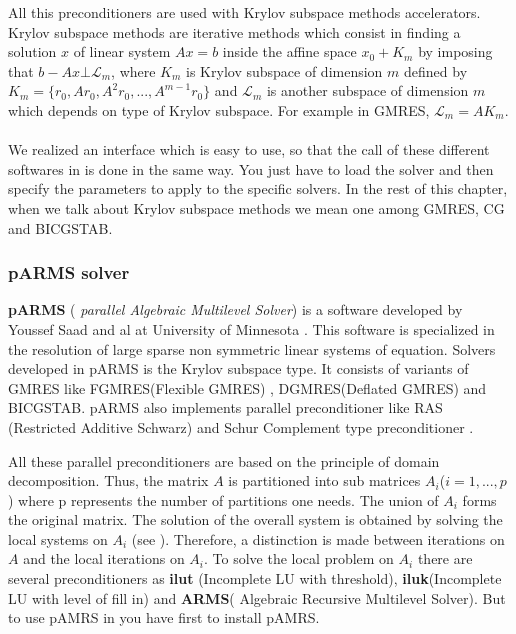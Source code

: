 \documentclass[a4paper,twoside,12pt]{book}
\begin{document}
All this preconditioners are used with Krylov subspace methods accelerators.
Krylov subspace methods are iterative methods
which consist in finding a solution $x$ of linear system $Ax=b$ inside the
affine space $x_0+K_m$ by imposing that $b-Ax \bot \mathcal{L}_m$, where $K_m$
is Krylov subspace of dimension $m$ defined by $K_m=\{r_0, Ar_0,
A^2r_0,...,A^{m-1}r_0\}$ and $\mathcal{L}_m$ is another subspace of dimension
$m$ which depends on type of Krylov subspace. For example in GMRES,
$\mathcal{L}_m=AK_m$.
\\\\
We realized an interface which is easy to use, so that the call of these
different softwares in \freefempp is done in the same way.
You just have to load the solver and then specify the parameters to  apply to
the specific  solvers. In the rest of this chapter,
when  we talk about Krylov subspace methods we mean one among  GMRES, CG and
BICGSTAB.

\subsubsection{pARMS solver}
\label{sectionparms}
\textbf{pARMS} ( \textit{parallel Algebraic Multilevel Solver})
is a software developed by Youssef Saad and al at University of
 Minnesota \cite{spARMS}.
This software is specialized in the resolution of large sparse non symmetric
linear systems of equation. Solvers developed in pARMS is the Krylov subspace
type.
It consists of variants of GMRES like FGMRES(Flexible GMRES)  , DGMRES(Deflated
GMRES) \cite{SAAD03} and  BICGSTAB.
pARMS also implements parallel preconditioner like RAS (Restricted Additive
Schwarz)\cite{CAI89}
and Schur Complement type preconditioner \cite{LISAAD}.



All these  parallel preconditioners are based on the principle of domain
decomposition.
Thus, the matrix $A$ is partitioned into sub matrices $A_i$($i=1,...,p$) where
p represents the number of partitions one needs.
The union of $A_i$ forms the original matrix.
The solution of the overall system is obtained by solving the local systems on
$A_i$ (see \cite{Smith96}).
Therefore, a distinction is made between iterations on $A$ and the local
iterations on $A_i$.
To solve the local problem on $A_i$ there are several preconditioners as
\textbf{ilut} (Incomplete  LU with threshold),
\textbf{iluk}(Incomplete  LU with level of fill in) and \textbf{ARMS}( Algebraic
Recursive Multilevel Solver). But to use pAMRS in
\freefempp you have first to install pAMRS.
\end{document}
